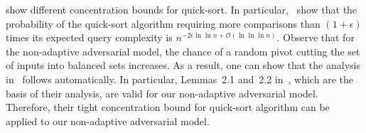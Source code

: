 \documentclass[twoside,11pt]{article}
\newcommand{\cO}{\mathcal{O}}
\newcommand{\errorquicksort}{\epsilon}
\begin{document}
\citet{Donald99,Hennequin89,McdiarmidH92} show different concentration
bounds for quick-sort. In particular,~\citet{McdiarmidH92} show that
the probability of the quick-sort algorithm requiring more comparisons
than $(1+\errorquicksort)$ times its expected query complexity is
$n^{-2\errorquicksort\ln\ln n +\cO(\ln \ln \ln n)}$. Observe that for
the non-adaptive adversarial model, the chance of a random pivot
cutting the set of inputs into balanced sets increases. As a result,
one can show that the analysis in~\citet{McdiarmidH92} follows
automatically. In particular, Lemmas~2.1 and~2.2 in~\citet{McdiarmidH92}, which are the basis of their analysis, are valid
for our non-adaptive adversarial model. Therefore, their tight
concentration bound for quick-sort algorithm can be applied to our
non-adaptive adversarial model. 
\appendix
\end{document}
